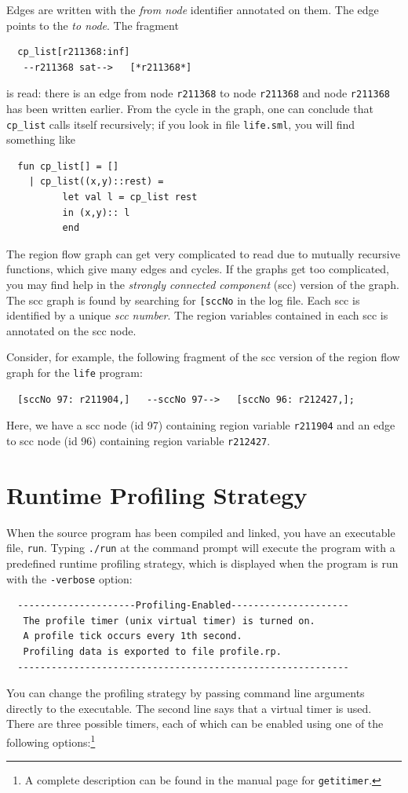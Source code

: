 \documentclass[12pt]{book}
\begin{document}
Edges are written with the {\em from node\/} identifier annotated on
them. The edge points to the \emph{to node}. The fragment
\begin{verbatim}
  cp_list[r211368:inf]
   --r211368 sat-->   [*r211368*]
\end{verbatim}
is read: there is an edge from node \texttt{r211368} to node
\texttt{r211368} and node \texttt{r211368} has been written earlier. From
the cycle in the graph, one can conclude that \texttt{cp\_list} calls
itself recursively; if you look in file {\tt life.sml}, you will
find something like
\begin{verbatim}
  fun cp_list[] = []
    | cp_list((x,y)::rest) =
          let val l = cp_list rest
          in (x,y):: l
          end
\end{verbatim}

The region flow graph can get very complicated to read due to
mutually recursive functions, which give many edges and cycles.  If the
graphs get too complicated, you may find help in the
%
{\em strongly connected component\/} (scc) version of the graph.  The
scc graph is found by searching for \texttt{[sccNo} in the log file.
Each scc is identified by a unique {\em scc number}. The region
variables contained in each scc is annotated on the scc node.

Consider, for example, the following fragment of the scc version of
the region flow graph for the {\tt life} program:
\begin{verbatim}
  [sccNo 97: r211904,]   --sccNo 97-->   [sccNo 96: r212427,];
\end{verbatim}
Here, we have a scc node (id 97) containing region variable
\texttt{r211904} and an edge to scc node (id 96) containing region
variable \texttt{r212427}.

\section{Runtime Profiling Strategy}
When the source program has been compiled and linked, you have an
executable file, \texttt{run}. Typing \texttt{./run} at the command prompt will
execute the program with a predefined
%
runtime profiling strategy, which is displayed when the program is
run with the {\tt -verbose} option:
\begin{verbatim}
  ---------------------Profiling-Enabled---------------------
   The profile timer (unix virtual timer) is turned on.
   A profile tick occurs every 1th second.
   Profiling data is exported to file profile.rp.
  -----------------------------------------------------------
\end{verbatim}
You can change the
%
profiling strategy by passing command line arguments directly to the
executable.  The second line says that a virtual timer is used. There
are three possible timers, each of which can be enabled using one of
the following options:\footnote{A complete description can be
    found in the manual page for \texttt{getitimer}.}
\end{document}
